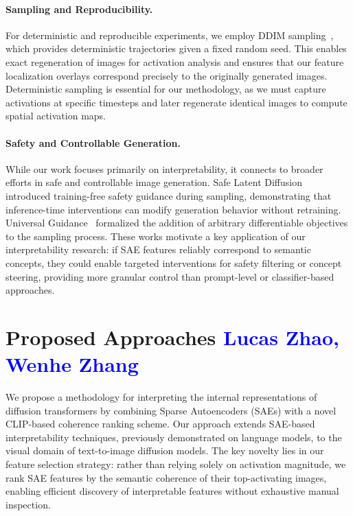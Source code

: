 \documentclass{article}
\begin{document}
\paragraph{Sampling and Reproducibility.}
For deterministic and reproducible experiments, we employ DDIM sampling~\citep{Song2020DDIM}, which provides deterministic trajectories given a fixed random seed. This enables exact regeneration of images for activation analysis and ensures that our feature localization overlays correspond precisely to the originally generated images. Deterministic sampling is essential for our methodology, as we must capture activations at specific timesteps and later regenerate identical images to compute spatial activation maps.

\paragraph{Safety and Controllable Generation.}
While our work focuses primarily on interpretability, it connects to broader efforts in safe and controllable image generation. Safe Latent Diffusion~\citep{i2p_hf} introduced training-free safety guidance during sampling, demonstrating that inference-time interventions can modify generation behavior without retraining. Universal Guidance~\citep{UniversalGuidance2023} formalized the addition of arbitrary differentiable objectives to the sampling process. These works motivate a key application of our interpretability research: if SAE features reliably correspond to semantic concepts, they could enable targeted interventions for safety filtering or concept steering, providing more granular control than prompt-level or classifier-based approaches.


\section{Proposed Approaches \textcolor{blue}{Lucas Zhao, Wenhe Zhang}}
\label{sec:approaches}

We propose a methodology for interpreting the internal representations of diffusion transformers by combining Sparse Autoencoders (SAEs) with a novel CLIP-based coherence ranking scheme. Our approach extends SAE-based interpretability techniques, previously demonstrated on language models, to the visual domain of text-to-image diffusion models. The key novelty lies in our feature selection strategy: rather than relying solely on activation magnitude, we rank SAE features by the semantic coherence of their top-activating images, enabling efficient discovery of interpretable features without exhaustive manual inspection.
\end{document}
